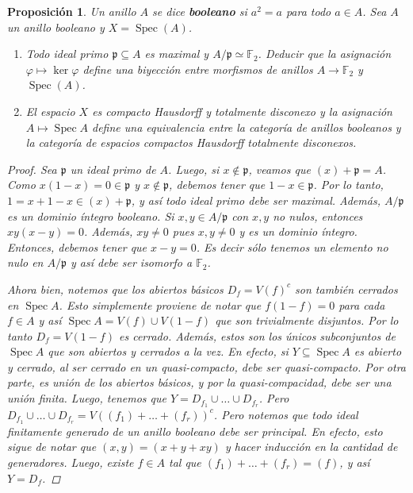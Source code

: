 \documentclass[11pt,a4paper, spanish,oneside,fleqn]{article}
\newtheorem{prop}[teo]{Proposición}
\theoremstyle{definition}
\newcommand{\FF}{\mathbb{F}}
\DeclareMathOperator{\spec}{Spec}
\begin{document}
\begin{prop}
Un anillo $A$ se dice \textbf{booleano} si $a^2 = a$ para todo $a\in A$. Sea $A$ un anillo booleano y $X=\spec(A)$.
\begin{enumerate}
\item Todo ideal primo $\mathfrak{p}\subseteq A$ es maximal y $A/\mathfrak{p}\simeq \FF_2$. Deducir que la asignación $\varphi\mapsto \ker\varphi$ define una biyección entre morfismos de anillos $A\to \FF_2$ y $\spec(A)$.
\item El espacio $X$ es compacto Hausdorff y totalmente disconexo y la asignación $A\mapsto \spec A$ define una equivalencia entre la categoría de anillos booleanos y la categoría de espacios compactos Hausdorff totalmente disconexos. 
\end{enumerate}
\begin{proof}
Sea $\mathfrak{p}$ un ideal primo de $A$. Luego, si $x\notin \mathfrak{p}$, veamos que $(x)+\mathfrak{p} = A$. Como $x(1-x) = 0\in\mathfrak{p}$ y $x\notin \mathfrak{p}$, debemos tener que $1-x\in\mathfrak{p}$. Por lo tanto, $1 = x + 1-x \in (x) + \mathfrak{p}$, y así todo ideal primo debe ser maximal. Además, $A/\mathfrak{p}$ es un dominio íntegro booleano. Si $x,y\in A/\mathfrak{p}$ con $x,y$ no nulos, entonces $xy(x-y)=0$. Además, $xy \neq 0$ pues $x,y\neq 0$ y es un dominio íntegro. Entonces, debemos tener que $x-y=0$. Es decir sólo tenemos un elemento no nulo en $A/\mathfrak{p}$ y así debe ser isomorfo a $\FF_2$.

Ahora bien, notemos que los abiertos básicos $D_f = V(f)^c$ son también cerrados en $\spec A$. Esto simplemente proviene de notar que $f(1-f)=0$ para cada $f\in A$ y así $\spec A = V(f) \cup V(1-f)$ que son trivialmente disjuntos. Por lo tanto $D_f = V(1-f)$ es cerrado. Además, estos son los únicos subconjuntos de $\spec A$ que son abiertos y cerrados a la vez. En efecto, si $Y\subseteq \spec A$ es abierto y cerrado, al ser cerrado en un quasi-compacto, debe ser quasi-compacto. Por otra parte, es unión de los abiertos básicos, y por la quasi-compacidad, debe ser una unión finita. Luego, tenemos que $Y=D_{f_1}\cup\ldots\cup D_{f_r}$. Pero $D_{f_1}\cup\ldots \cup D_{f_r} = V((f_1)+\ldots + (f_r))^c$. Pero notemos que todo ideal finitamente generado de un anillo booleano debe ser principal. En efecto, esto sigue de notar que $(x,y) = (x+y+xy)$ y hacer inducción en la cantidad de generadores. Luego, existe $f\in A$ tal que $(f_1)+\ldots + (f_r) = (f)$, y así $Y = D_f$.


\end{proof}
\end{prop}
\end{document}
